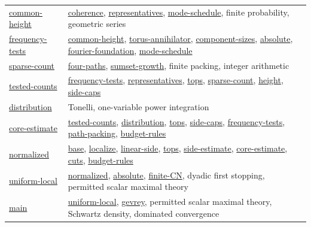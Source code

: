 \documentclass[11pt]{article}
\theoremstyle{definition}
\numberwithin{equation}{section}
\begin{document}
\begin{longtable}{@{}p{}p{}@{}}
\hyperlink{bp:common-height}{common-height} & \hyperlink{bp:coherence}{coherence}, \hyperlink{bp:representatives}{representatives}, \hyperlink{bp:mode-schedule}{mode-schedule}, finite probability, geometric series\\[3pt]
\hyperlink{bp:frequency-tests}{frequency-tests} & \hyperlink{bp:common-height}{common-height}, \hyperlink{bp:torus-annihilator}{torus-annihilator}, \hyperlink{bp:component-sizes}{component-sizes}, \hyperlink{bp:absolute}{absolute}, \hyperlink{bp:fourier-foundation}{fourier-foundation}, \hyperlink{bp:mode-schedule}{mode-schedule}\\[3pt]
\hyperlink{bp:sparse-count}{sparse-count} & \hyperlink{bp:four-paths}{four-paths}, \hyperlink{bp:sumset-growth}{sumset-growth}, finite packing, integer arithmetic\\[3pt]
\hyperlink{bp:tested-counts}{tested-counts} & \hyperlink{bp:frequency-tests}{frequency-tests}, \hyperlink{bp:representatives}{representatives}, \hyperlink{bp:tops}{tops}, \hyperlink{bp:sparse-count}{sparse-count}, \hyperlink{bp:height}{height}, \hyperlink{bp:side-caps}{side-caps}\\[3pt]
\hyperlink{bp:distribution}{distribution} & Tonelli, one-variable power integration\\[3pt]
\hyperlink{bp:core-estimate}{core-estimate} & \hyperlink{bp:tested-counts}{tested-counts}, \hyperlink{bp:distribution}{distribution}, \hyperlink{bp:tops}{tops}, \hyperlink{bp:side-caps}{side-caps}, \hyperlink{bp:frequency-tests}{frequency-tests}, \hyperlink{bp:path-packing}{path-packing}, \hyperlink{bp:budget-rules}{budget-rules}\\[3pt]
\hyperlink{bp:normalized}{normalized} & \hyperlink{bp:base}{base}, \hyperlink{bp:localize}{localize}, \hyperlink{bp:linear-side}{linear-side}, \hyperlink{bp:tops}{tops}, \hyperlink{bp:side-estimate}{side-estimate}, \hyperlink{bp:core-estimate}{core-estimate}, \hyperlink{bp:cuts}{cuts}, \hyperlink{bp:budget-rules}{budget-rules}\\[3pt]
\hyperlink{bp:uniform-local}{uniform-local} & \hyperlink{bp:normalized}{normalized}, \hyperlink{bp:absolute}{absolute}, \hyperlink{bp:finite-CN}{finite-CN}, dyadic first stopping, permitted scalar maximal theory\\[3pt]
\hyperlink{bp:main}{main} & \hyperlink{bp:uniform-local}{uniform-local}, \hyperlink{bp:gevrey}{gevrey}, permitted scalar maximal theory, Schwartz density, dominated convergence\\[3pt]
\end{longtable}
\end{document}
